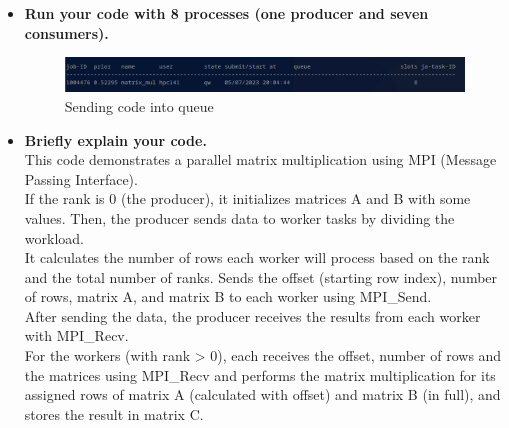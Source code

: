 \documentclass[11pt]{article}
\begin{document}


\begin{itemize}
    \item \textbf{Run your code with 8 processes (one producer and seven consumers).}
    
    \begin{figure}[h!]
        \centering
        \includegraphics{matrixmul.png}
        \caption*{Sending code into queue}
        \label{fig:4}
    \end{figure}

    \item \textbf{Briefly explain your code.}\\
    This code demonstrates a parallel matrix multiplication using MPI (Message Passing Interface).\\
    If the rank is 0 (the producer), it initializes matrices A and B with some values. Then, the producer sends data to worker tasks by dividing the workload.\\
    It calculates the number of rows each worker will process based on the rank and the total number of ranks.
    Sends the offset (starting row index), number of rows, matrix A, and matrix B to each worker using MPI\_Send.\\
    After sending the data, the producer receives the results from each worker with MPI\_Recv.\\
    For the workers (with rank > 0), each receives the offset, number of rows and the matrices using MPI\_Recv and performs the matrix multiplication for its assigned rows of matrix A (calculated with offset) and matrix B (in full), and stores the result in matrix C.


\end{itemize}
\end{document}
